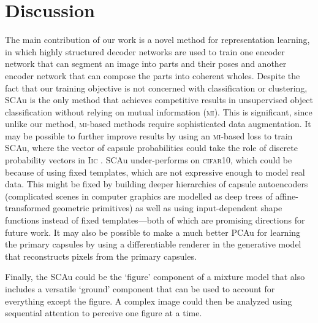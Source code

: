 \section{Discussion}\vspace*{-5pt}
\label{sec:discussion}
    The main contribution of our work is a novel method for representation learning, in which highly structured decoder networks are used to train one encoder network that can segment an image into parts and their poses and another encoder network that can compose the parts into coherent wholes.
    Despite the fact that our training objective is not concerned with classification or clustering,
    \gls{SCAu} is the only method that achieves competitive results in unsupervised object classification without relying on mutual information (\textsc{mi}).
    This is significant, since unlike our method, \textsc{mi}-based methods require sophisticated data augmentation.
    It may be possible to further improve results by using an \textsc{mi}-based loss to train \gls{SCAu}, where the vector of capsule probabilities could take the role of discrete probability vectors in \textsc{Iic} \citep{Iic}.
    \gls{SCAu} under-performs on \textsc{cifar10}, which could be because of using fixed templates, which are not expressive enough to model real data.
    This might be fixed by building deeper hierarchies of capsule autoencoders (\!\eg complicated scenes in computer graphics are modelled as deep trees of affine-transformed geometric primitives) as well as using input-dependent shape functions instead of fixed templates---both of which are promising directions for future work.
    It may also be possible to make a much better \gls{PCAu} for learning the primary capsules by using a differentiable renderer in the generative model that reconstructs pixels from the primary capsules.
    
    Finally, the \gls{SCAu} could be the `figure' component of a mixture model that also includes a versatile `ground' component  that can be used to account for everything except the figure.  A complex image could then be analyzed using sequential attention to perceive one figure at a time. 